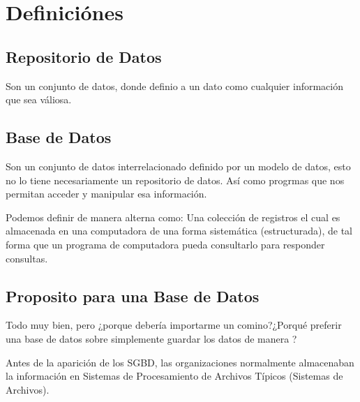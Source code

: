 \documentclass[12pt, fleqn]{report}                             %
\newcommand \Quote {\qq}                                        %
\begin{document}
    \chapter{Definiciónes}

        \clearpage
        \section{Repositorio de Datos}
            
            Son un conjunto de datos, donde definio a un dato como cualquier información
            que sea váliosa.


        \section{Base de Datos}

            Son un conjunto de datos interrelacionado definido por un modelo de datos, esto no lo
            tiene necesariamente un repositorio de datos. Así como progrmas que nos permitan acceder
            y manipular esa información.

            Podemos definir de manera alterna como: Una colección de registros el cual es almacenada
            en una computadora de una forma sistemática (estructurada), de tal forma que un programa
            de computadora pueda consultarlo para responder consultas.



        \section{Proposito para una Base de Datos}

            Todo muy bien, pero ¿porque debería importarme un comino?¿Porqué preferir una base de datos
            sobre simplemente guardar los datos de manera \Quote{común}?

            Antes de la aparición de los SGBD, las organizaciones normalmente almacenaban la
            información en Sistemas de Procesamiento de Archivos Típicos (Sistemas de Archivos).
\end{document}
